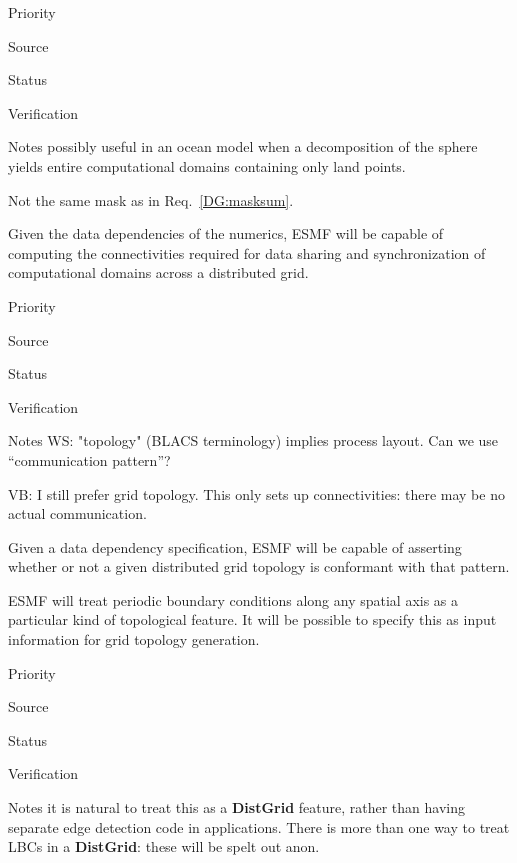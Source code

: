 \begin{reqlist}
\item[Priority]
\item[Source]
\item[Status]
\item[Verification]
\item[Notes] possibly useful in an ocean model when a decomposition
  of the sphere yields entire computational domains containing only
  land points.

  Not the same mask as in Req.~\ref{DG:masksum}.
\end{reqlist}


Given the data dependencies of the numerics, ESMF will be capable of
computing the connectivities required for data sharing and
synchronization of computational domains across a distributed grid.


\begin{reqlist}
\item[Priority]
\item[Source]
\item[Status]
\item[Verification]
\item[Notes] WS:  "topology" (BLACS terminology) implies process layout.
Can we use ``communication pattern''?

VB: I still prefer grid topology. This only sets up connectivities:
there may be no actual communication.

\end{reqlist}


Given a data dependency specification, ESMF will be capable of
asserting whether or not a given distributed grid topology is
conformant with that pattern.


ESMF will treat periodic boundary conditions along any spatial axis as
a particular kind of topological feature. It will be possible to
specify this as input information for grid topology generation.

\begin{reqlist}
\item[Priority]
\item[Source]
\item[Status]
\item[Verification]
\item[Notes] it is natural to treat this as a \textbf{DistGrid}
  feature, rather than having separate edge detection code in
  applications. There is more than one way to treat LBCs in a
  \textbf{DistGrid}: these will be spelt out anon.
\end{reqlist}

